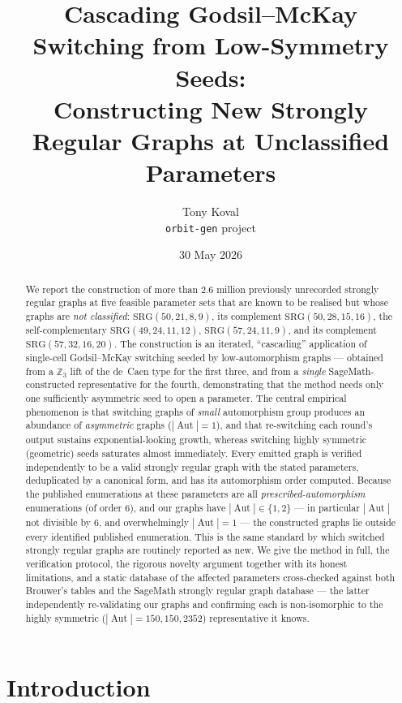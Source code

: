 \documentclass[11pt]{article}
\title{\textbf{Cascading Godsil--McKay Switching from Low-Symmetry Seeds:\\
Constructing New Strongly Regular Graphs at Unclassified Parameters}}
\author{Tony Koval\\[2pt]\small \texttt{orbit-gen} project}
\date{30 May 2026}
\theoremstyle{definition}
\newcommand{\SRG}[1]{\mathrm{SRG}(#1)}
\newcommand{\Aut}{\operatorname{Aut}}
\begin{document}
\maketitle

\begin{abstract}
We report the construction of more than $2.6$ million previously unrecorded
strongly regular graphs at five feasible parameter sets that are known to be
realised but whose graphs are \emph{not classified}: $\SRG{50,21,8,9}$,
its complement $\SRG{50,28,15,16}$, the self-complementary
$\SRG{49,24,11,12}$, $\SRG{57,24,11,9}$, and its complement $\SRG{57,32,16,20}$. The construction is an iterated, ``cascading''
application of single-cell Godsil--McKay switching seeded by low-automorphism graphs ---
obtained from a $\mathbb{Z}_3$ lift of the de~Caen type for the first three, and from a
\emph{single} SageMath-constructed representative for the fourth, demonstrating that the
method needs only one sufficiently asymmetric seed to open a parameter. The central empirical phenomenon is that
switching graphs of \emph{small} automorphism group produces an abundance of
\emph{asymmetric} graphs ($|\Aut|=1$), and that re-switching each round's output
sustains exponential-looking growth, whereas switching highly symmetric (geometric)
seeds saturates almost immediately. Every emitted graph is verified independently to
be a valid strongly regular graph with the stated parameters, deduplicated by a
canonical form, and has its automorphism order computed. Because the published
enumerations at these parameters are all \emph{prescribed-automorphism} enumerations
(of order $6$), and our graphs have $|\Aut|\in\{1,2\}$ --- in particular $|\Aut|$ not
divisible by $6$, and overwhelmingly $|\Aut|=1$ --- the constructed graphs lie outside
every identified published enumeration. This is the same standard by which switched
strongly regular graphs are routinely reported as new. We give the method in full,
the verification protocol, the rigorous novelty argument together with its honest
limitations, and a static database of the affected parameters cross-checked against both
Brouwer's tables and the SageMath strongly regular graph database --- the latter
independently re-validating our graphs and confirming each is non-isomorphic to the
highly symmetric ($|\Aut|=150,150,2352$) representative it knows.
\end{abstract}

\tableofcontents

\section{Introduction}
\end{document}
